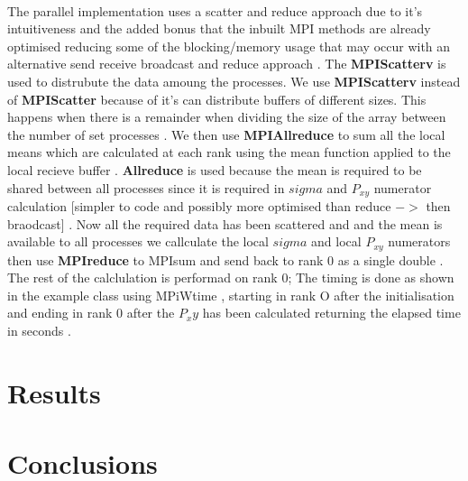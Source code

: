 \documentclass[12pt]{article}
\begin{document}
\paragraph*{}
The parallel implementation uses a scatter and reduce approach due to it's intuitiveness and the added bonus that the inbuilt MPI methods are already optimised reducing some of the blocking/memory usage that may occur with an alternative send receive broadcast and reduce approach .
The \textbf{MPI\textunderscore Scatterv} is used to distrubute the data amoung the processes. We use \textbf{MPI\textunderscore Scatterv} instead of \textbf{MPI\textunderscore Scatter} because of it's can distribute buffers of different sizes. This happens when there is a remainder when dividing the size of the array between the number of set processes . We then use 
\textbf{MPI\textunderscore Allreduce} to sum all the local means which are calculated at each rank using the mean function applied to the local recieve buffer . \textbf{Allreduce} is used because the mean is required to be shared between all processes since it is required in $sigma$ and $P_{xy}$ numerator calculation [simpler to code and possibly more optimised than reduce $ -> $ then braodcast] . Now all the required data has been scattered and and the mean is available to all processes we callculate the local $sigma$ and local $P_{xy}$ numerators then use \textbf{MPI\textunderscore reduce} to MPIsum and send back to rank 0 as a single double . The rest of the calclulation is performad on rank 0; The timing is done as shown in the example class using MPi\textunderscore Wtime , starting in rank O after the initialisation and ending in rank 0 after the $P_xy$ has been calculated returning the elapsed time in seconds . 

\section{Results}




\section{Conclusions}\label{conclusions}


%

%
\end{document}

